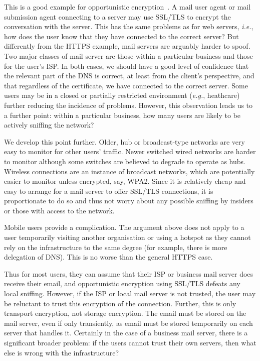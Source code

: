 \documentclass{article}
\def\cite{\citep}
\newcommand{\eg}{\textit{e.g.}}
\newcommand{\ie}{\textit{i.e.}}
\begin{document}
This is a good example for opportunistic encryption~\cite{Garfinkel03}.  A mail user
agent or mail submission agent connecting to a server may use
SSL/TLS to encrypt the conversation with the server.  This has the
same problems as for web servers, \ie, how does the user know that
they have connected to the correct server?  But differently from the
HTTPS example, mail servers are arguably harder to spoof.  Two
major classes of mail server are those within a particular business
and those for the user's ISP.  In both cases, we should have a good
level of confidence that the relevant part of the DNS is correct, at least from the
client's perspective, and that regardless of the
certificate, we have connected to the correct server. 
Some users may be in a closed or partially restricted environment (\eg, heathcare) further reducing the incidence of problems.
However, this
observation leads us to a further point: within a particular business,
how many users are likely to be actively sniffing the network?

We develop this point further.  Older, hub or broadcast-type networks
are very easy to monitor for other users' traffic.  Newer switched
wired networks are harder to monitor although some switches are
believed to degrade to operate as hubs.  Wireless connections are an
instance of broadcast networks, which are potentially easier to
monitor unless encrypted, say, WPA2.  Since it is relatively cheap
and easy to arrange for a mail server to offer SSL/TLS connections, it
is proportionate to do so and thus not worry about any possible
sniffing by insiders or those with access to the network.

Mobile users provide a complication.  The argument above does not
apply to a user temporarily visiting another organisation or using a
hotspot as they cannot rely on the infrastructure to the same degree
(for example, there is more delegation of DNS).  This is no worse than
the general HTTPS case.

Thus for most users, they can assume that their ISP or business mail server
does receive their email, and opportunistic encryption using SSL/TLS
defeats any local sniffing.  However, if the ISP or local mail server
is not trusted, the user may be reluctant to trust this encryption of
the connection.  Further, this is  only transport encryption, not storage
encryption.  The email must be stored on the mail server, even if only
transiently, as email must be stored temporarily on each server that
handles it.  Certainly in the case of a business mail server, there
is a significant broader problem: if the users cannot trust their own
servers, then what else is wrong with the infrastructure?
\end{document}

